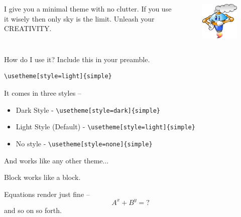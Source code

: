 \documentclass[xetex, aspectratio=169,professionalfont]{beamer}
\begin{document}
\begin{frame}
\vspace{2\baselineskip}
\end{frame}


\begin{frame}
\centering 
\begin{columns}
	I give you a minimal theme with no clutter. If you use it wisely then only sky is the limit. 
	Unleash your {\Huge \alert{CREATIVITY}}.
	\begin{figure}
		\includegraphics[width=4cm]{img/think}
	\end{figure}
\end{columns}

\end{frame}

\begin{frame}[fragile]{How do I use it?}
	Include this in your preamble.
\begin{verbatim}
\usetheme[style=light]{simple} 
\end{verbatim}

It comes in	three styles --
\begin{itemize}
	\item Dark Style - \verb|\usetheme[style=dark]{simple} |
	\item \alert{Light Style (Default)}  - \verb|\usetheme[style=light]{simple} |
	\item No style - \verb|\usetheme[style=none]{simple} |
\end{itemize}

And works like any other theme...

\begin{block}{Block}
works like a block.
\end{block}

Equations render just fine -- 
\begin{equation}
A^x + B^y = ?
\end{equation}
and so on so forth.
\end{frame}
\end{document}
